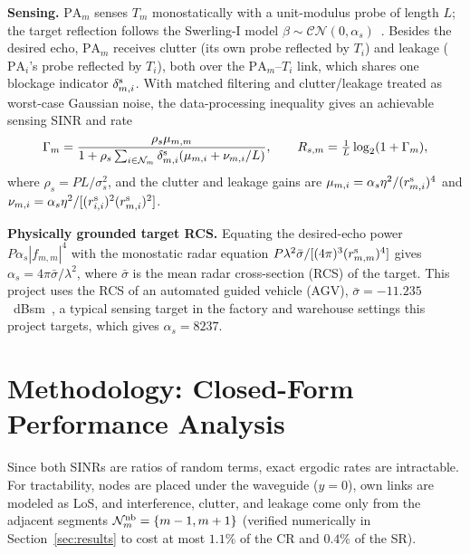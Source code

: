 \documentclass[11pt,a4paper]{article}
\begin{document}
\textbf{Sensing.} $\mathrm{PA}_m$ senses $T_m$ monostatically with a unit-modulus probe of length $L$; the target reflection follows the Swerling-I model $\beta\sim\mathcal{CN}(0,\alpha_s)$~\cite{Ouyang2023MI,Richards2014}. Besides the desired echo, $\mathrm{PA}_m$ receives clutter (its own probe reflected by $T_i$) and leakage ($\mathrm{PA}_i$'s probe reflected by $T_i$), both over the $\mathrm{PA}_m$--$T_i$ link, which shares one blockage indicator $\delta^{\rm s}_{m,i}$. With matched filtering and clutter/leakage treated as worst-case Gaussian noise, the data-processing inequality gives an achievable sensing SINR and rate
\begin{equation}
\Gamma_m=\frac{\rho_s\mu_{m,m}}{1+\rho_s\sum_{i\in\mathcal N_m}\delta^{\rm s}_{m,i}(\mu_{m,i}+\nu_{m,i}/L)},\qquad R_{s,m}=\tfrac1L\log_2(1+\Gamma_m),
\label{eq:sens}
\end{equation}
where $\rho_s=PL/\sigma_s^2$, and the clutter and leakage gains are $\mu_{m,i}=\alpha_s\eta^2/(r^{\rm s}_{m,i})^4$ and $\nu_{m,i}=\alpha_s\eta^2/[(r^{\rm s}_{i,i})^2(r^{\rm s}_{m,i})^2]$.

\textbf{Physically grounded target RCS.} Equating the desired-echo power $P\alpha_s|f_{m,m}|^4$ with the monostatic radar equation $P\lambda^2\bar\sigma/[(4\pi)^3(r^{\rm s}_{m,m})^4]$ gives $\alpha_s=4\pi\bar\sigma/\lambda^2$, where $\bar\sigma$ is the mean radar cross-section (RCS) of the target. This project uses the RCS of an automated guided vehicle (AGV), $\bar\sigma=-11.235$~dBsm~\cite{11432057}, a typical sensing target in the factory and warehouse settings this project targets, which gives $\alpha_s=8237$.

\section{Methodology: Closed-Form Performance Analysis}
Since both SINRs are ratios of random terms, exact ergodic rates are intractable. For tractability, nodes are placed under the waveguide ($y=0$), own links are modeled as LoS, and interference, clutter, and leakage come only from the adjacent segments $\mathcal N_m^{\rm nb}=\{m-1,m+1\}$ (verified numerically in Section~\ref{sec:results} to cost at most $1.1\%$ of the CR and $0.4\%$ of the SR).
\end{document}
